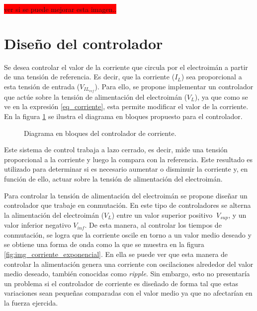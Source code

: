 \colorbox{red}{ver si se puede mejorar esta imagen..}

\section{Diseño del controlador}

Se desea controlar el valor de la corriente que circula por el electroimán a partir de una tensión de referencia. Es decir, que la corriente ($I_L$) sea proporcional a esta tensión de entrada ($V_{IL_{ref}}$). Para ello, se propone implementar un controlador que actúe sobre la tensión de alimentación del electroimán ($V_L$), ya que como se ve en la expresión \ref{eq_corriente}, esta permite modificar el valor de la corriente. En la figura \ref{fig:img_diagrama_bloques_basico_cc} se ilustra el diagrama en bloques propuesto para el controlador.


\begin{figure}[H]
	\centering
	
	\caption{Diagrama en bloques del controlador de corriente.}
	\label{fig:img_diagrama_bloques_basico_cc}
\end{figure}

Este sistema de control trabaja a lazo cerrado, es decir, mide una tensión proporcional a la corriente y luego la compara con la referencia. Este resultado es utilizado para determinar si es necesario aumentar o disminuir la corriente y, en función de ello, actuar sobre la tensión de alimentación del electroimán.

Para controlar la tensión de alimentación del electroimán se propone diseñar un controlador que trabaje en conmutación. En este tipo de controladores se alterna la alimentación del electroimán ($V_L$) entre un valor superior positivo $\ V_{sup}$, y un valor inferior negativo $V_{inf}$. De esta manera, al controlar los tiempos de conmutación, se logra que la corriente oscile en torno a un valor medio deseado y se obtiene una forma de onda como la que se muestra en la figura  \ref{fig:img_corriente_exponencial}. En ella se puede ver que esta manera de controlar la alimentación genera una corriente con oscilaciones alrededor del valor medio deseado, también conocidas como \textsl{ripple}. Sin embargo, esto no presentaría un problema si el controlador de corriente es diseñado de forma tal que estas variaciones sean pequeñas comparadas con el valor medio ya que no afectarían en la fuerza ejercida.

